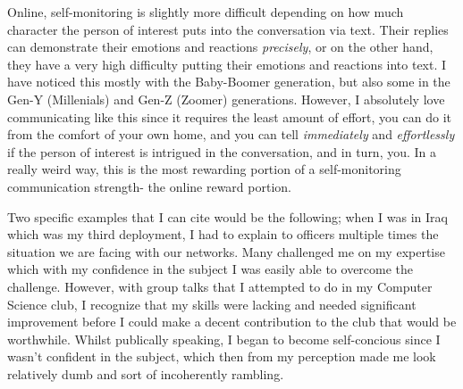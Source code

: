 \documentclass[12pt]{article}
\begin{document}
\par
Online, self-monitoring is slightly more difficult depending on how much character the person of interest puts into the conversation via text. Their replies can demonstrate their emotions and reactions \emph{precisely}, or on the other hand, they have a very high difficulty putting their emotions and reactions into text. I have noticed this mostly with the Baby-Boomer generation, but also some in the Gen-Y (Millenials) and Gen-Z (Zoomer) generations. However, I absolutely love communicating like this since it requires the least amount of effort, you can do it from the comfort of your own home, and you can tell \emph{immediately} and \emph{effortlessly} if the person of interest is intrigued in the conversation, and in turn, you. In a really weird way, this is the most rewarding portion of a self-monitoring communication strength- the online reward portion.
\par
Two specific examples that I can cite would be the following; when I was in Iraq which was my third deployment, I had to explain to officers multiple times the situation we are facing with our networks. Many challenged me on my expertise which with my confidence in the subject I was easily able to overcome the challenge. However, with group talks that I attempted to do in my Computer Science club, I recognize that my skills were lacking and needed significant improvement before I could make a decent contribution to the club that would be worthwhile. Whilst publically speaking, I began to become self-concious since I wasn't confident in the subject, which then from my perception made me look relatively dumb and sort of incoherently rambling.
\end{document}
